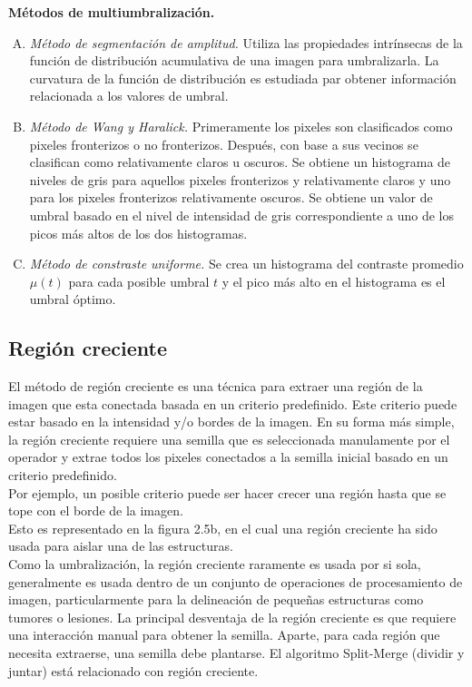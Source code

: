 \documentclass[12pt]{report}
\begin{document}
\textbf{ Métodos de multiumbralización.}
\begin{enumerate}[A.]
\item \textit{Método de segmentación de amplitud.} Utiliza las propiedades intrínsecas de la función de distribución acumulativa de una imagen para umbralizarla. La curvatura de la función de distribución es estudiada par obtener información relacionada a los valores de umbral.

\item \textit{Método de Wang y Haralick.} Primeramente los pixeles son clasificados como pixeles fronterizos o no fronterizos. Después, con base a sus vecinos se clasifican como relativamente claros u oscuros. Se obtiene un histograma de niveles de gris para aquellos pixeles fronterizos y relativamente claros y uno para los pixeles fronterizos relativamente oscuros. Se obtiene un valor de umbral basado en el nivel de intensidad de gris correspondiente a uno de los picos más altos de los dos histogramas.

\item \textit{Método de constraste uniforme.} Se crea un histograma del contraste promedio $\mu(t)$ para cada posible umbral $t$ y el pico más alto en el histograma es el umbral óptimo.
\end{enumerate}

\subsection{Región creciente}
El método de región creciente es una técnica para extraer una región de la imagen que esta conectada basada en un criterio predefinido. Este criterio puede estar basado en la intensidad y/o bordes de la imagen. En su forma más simple, la región creciente requiere una semilla que es seleccionada manulamente por el operador y extrae todos los pixeles conectados a la semilla inicial basado en un criterio predefinido.\\

Por ejemplo, un posible criterio puede ser hacer crecer una región hasta que se tope con el borde de la imagen.\\

Esto es representado en la figura 2.5b, en el cual una región creciente ha sido usada para aislar una de las estructuras.\\

Como la umbralización, la región creciente raramente es usada por si sola, generalmente es usada dentro de un conjunto de operaciones de procesamiento de imagen, particularmente para la delineación de pequeñas estructuras como tumores o lesiones. La principal desventaja de la región creciente es que requiere una interacción manual para obtener la semilla. Aparte, para cada región que necesita extraerse, una semilla debe plantarse. El algoritmo Split-Merge (dividir y juntar) está relacionado con región creciente.\\
\end{document}
